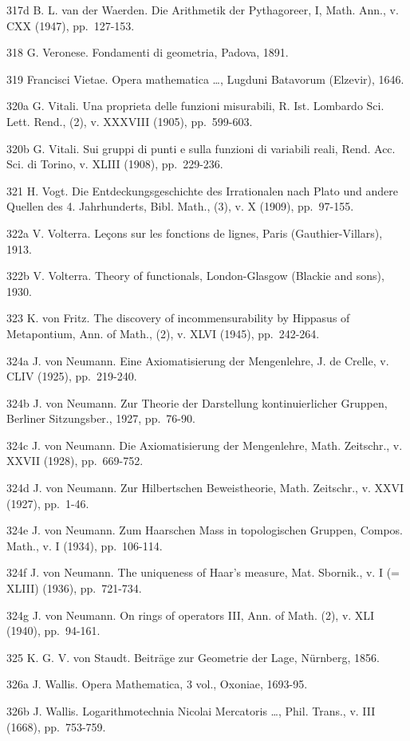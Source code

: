 317d B. L. van der Waerden. Die Arithmetik der Pythagoreer, I, Math. Ann., v. CXX (1947), pp.~127-153.

318 G. Veronese. Fondamenti di geometria, Padova, 1891.

319 Francisci Vietae. Opera mathematica \ldots, Lugduni Batavorum (Elzevir), 1646.

320a G. Vitali. Una proprieta delle funzioni misurabili, R. Ist. Lombardo Sci. Lett. Rend., (2), v. XXXVIII (1905), pp.~599-603.

320b G. Vitali. Sui gruppi di punti e sulla funzioni di variabili reali, Rend. Acc. Sci. di Torino, v. XLIII (1908), pp.~229-236.

321 H. Vogt. Die Entdeckungsgeschichte des Irrationalen nach Plato und andere Quellen des 4. Jahrhunderts, Bibl. Math., (3), v. X (1909), pp.~97-155.

322a V. Volterra. Leçons sur les fonctions de lignes, Paris (Gauthier-Villars), 1913.

322b V. Volterra. Theory of functionals, London-Glasgow (Blackie and sons), 1930.

323 K. von Fritz. The discovery of incommensurability by Hippasus of Metapontium, Ann. of Math., (2), v. XLVI (1945), pp.~242-264.

324a J. von Neumann. Eine Axiomatisierung der Mengenlehre, J. de Crelle, v. CLIV (1925), pp.~219-240.

324b J. von Neumann. Zur Theorie der Darstellung kontinuierlicher Gruppen, Berliner Sitzungsber., 1927, pp.~76-90.

324c J. von Neumann. Die Axiomatisierung der Mengenlehre, Math. Zeitschr., v. XXVII (1928), pp.~669-752.

324d J. von Neumann. Zur Hilbertschen Beweistheorie, Math. Zeitschr., v. XXVI (1927), pp.~1-46.

324e J. von Neumann. Zum Haarschen Mass in topologischen Gruppen, Compos. Math., v. I (1934), pp.~106-114.

324f J. von Neumann. The uniqueness of Haar's measure, Mat. Sbornik., v. I (= XLIII) (1936), pp.~721-734.

324g J. von Neumann. On rings of operators III, Ann. of Math. (2), v. XLI (1940), pp.~94-161.

325 K. G. V. von Staudt. Beiträge zur Geometrie der Lage, Nürnberg, 1856.

326a J. Wallis. Opera Mathematica, 3 vol., Oxoniae, 1693-95.

326b J. Wallis. Logarithmotechnia Nicolai Mercatoris \ldots, Phil. Trans., v. III (1668), pp.~753-759.

